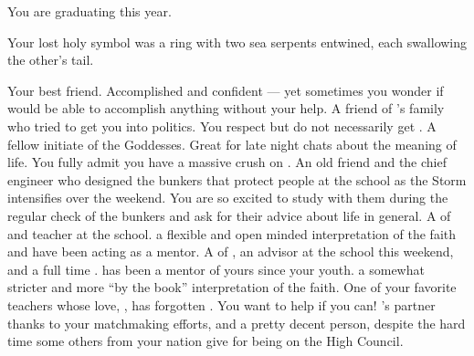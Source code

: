 \documentclass[char]{GL2020}
\begin{document}
\begin{itemz}[Notes]
    \item You are graduating this year.
    \item Your lost holy symbol was a ring with two sea serpents entwined, each swallowing the other's tail.
\end{itemz}

\begin{contacts}
    \contact{\cPresident{}} Your best friend. Accomplished and confident — yet sometimes you wonder if \cPresident{\they} would be able to accomplish anything without your help.
    \contact{\cJuniorStatesman{}} A friend of \cPresident{}’s family who tried to get you into politics. You respect \cJuniorStatesman{\them} but do not necessarily get \cJuniorStatesman{\them}.  
    \contact{\cWarlordDaughter{}} A fellow initiate of the Goddesses. Great for late night chats about the meaning of life. You fully admit you have a massive crush on \cWarlordDaughter{\them}.  
    \contact{\cBunker{}} An old friend and the chief engineer who designed the bunkers that protect people at the school as the Storm intensifies over the weekend. You are so excited to study with them during the regular check of the bunkers and ask for their advice about life in general.
    \contact{\cFlowPriest{}} A \cFlowPriest{\cleric} of \cFlow{} and teacher at the school. \cFlowPriest{\They} \cFlowPriest{\have} a flexible and open minded interpretation of the faith and have been acting as a mentor.
    \contact{\cEbbPriest{}} A \cEbbPriest{\cleric} of \cEbb{}, an advisor at the school this weekend, and a full time \cEbbPriest{\cleric}. \cEbbPriest{} has been a mentor of yours since your youth. \cEbbPriest{\They} \cEbbPriest{\have} a somewhat stricter and more ``by the book'' interpretation of the faith.
    \contact{\cChupAvenger{}} One of your favorite teachers whose love, \cHeadScientist{}, has forgotten \cChupAvenger{\them}. You want to help if you can!
    \contact{\cTechStar{}} \cWarlordDaughter{}’s partner thanks to your matchmaking efforts, and a pretty decent person, despite the hard time some others from your nation give \cTechStar{\them} for being on the \pTech{} High Council.
\end{contacts}
\end{document}
